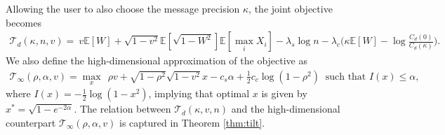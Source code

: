 \documentclass[12pt]{article}
\newcommand{\EE}{\mathbb E}
\theoremstyle{definition}
\theoremstyle{remark}
\begin{document}
Allowing the user to also choose the message precision $\kappa$, the joint objective becomes
\begin{align*}
    \mathcal{T}_d(\kappa,n,v) = \ v\mathbb E[W] + \sqrt{1-v^2} \mathbb E\left[\sqrt{1-W^2}\right] \mathbb E\left[\max_i X_i   \right] -\lambda_s \log n - \lambda_c \Big(\kappa \EE[W] - \log \frac{C_d(0)}{C_d(\kappa)}\Big).
\end{align*}
We also define the high-dimensional approximation of the objective as
\begin{align}
\label{eq:tilt_high_dim_obj}
    \mathcal{T}_{\infty} (\rho,\alpha,v) = \max_{x} \ \ \rho v + \sqrt{1-\rho^2} \sqrt{1-v^2} x - c_s \alpha + \frac{1}{2} c_c \log (1-\rho^2) \ \text{ such that } I(x) \leq \alpha,
\end{align}
where $I(x)  = -\frac{1}{2} \log(1-x^2)$, implying that optimal $x$ is given by $x^* = \sqrt{1-e^{-2\alpha}}$. The relation between $\mathcal{T}_d(\kappa,v,n)$ and the high-dimensional counterpart $\mathcal{T}_{\infty} (\rho,\alpha,v)$ is captured in Theorem \ref{thm:tilt}.
\end{document}
